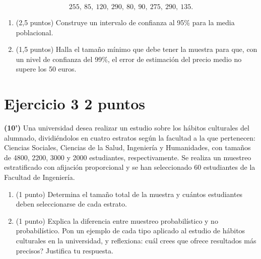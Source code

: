 \documentclass[11pt]{article}
\begin{document}
\[
255,\ 85,\ 120,\ 290,\ 80,\ 90,\ 275,\ 290,\ 135.
\]

\begin{enumerate}[label=(\alph*)]

 \item (2,5 puntos)  Construye un intervalo de confianza al 95\% para la media poblacional.



  \item (1,5 puntos)  Halla el tamaño mínimo que debe tener la muestra para que, con un nivel de confianza del 99\%, el error de estimación del precio medio no supere los 50 euros.

  

\end{enumerate}


\clearpage
\section*{Ejercicio 3 \hfill 2 puntos} \textbf{(10')} Una universidad desea realizar un estudio sobre los hábitos culturales del alumnado, dividiéndolos en cuatro estratos según la facultad a la que pertenecen: Ciencias Sociales, Ciencias de la Salud, Ingeniería y Humanidades, con tamaños de 4800, 2200, 3000 y 2000 estudiantes, respectivamente. Se realiza un muestreo estratificado con afijación proporcional y se han seleccionado 60 estudiantes de la Facultad de Ingeniería.

\begin{enumerate}[label=(\alph*)]
  \item (1 punto)  Determina el tamaño total de la muestra y cuántos estudiantes deben seleccionarse de cada estrato.
  
  

  \item (1 punto)  Explica la diferencia entre muestreo probabilístico y no probabilístico. Pon un ejemplo de cada tipo aplicado al estudio de hábitos culturales en la universidad, y reflexiona: \textquestiondown{}cuál crees que ofrece resultados más precisos? Justifica tu respuesta.

  
\end{enumerate}
\end{document}
